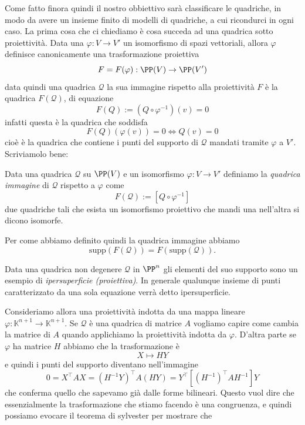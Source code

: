 \documentclass[11pt]{scrartcl}
\newcommand{\KK}{\mathbb{K}}
\begin{document}
	Come fatto finora quindi il nostro obbiettivo sarà classificare le quadriche, in modo da avere un insieme finito di modelli di quadriche, a cui ricondurci in ogni caso. La prima cosa che ci chiediamo è cosa succeda ad una quadrica sotto proiettività. Data una $\varphi:V\to V'$ un isomorfismo di spazi vettoriali, allora $\varphi$ definisce canonicamente una trasformazione proiettiva
	$$F=F(\varphi):\PP(V)\to\PP(V')$$
	data quindi una quadrica $\mathcal{Q}$ la sua immagine rispetto alla proiettività $F$ è la quadrica $F(\mathcal{Q})$, di equazione
	$$F(Q):=(Q\circ \varphi^{-1})(v)=0$$
	infatti questa è la quadrica che soddisfa
	$$F(Q)\left(\varphi(v)\right)=0 \iff Q(v)=0$$
	cioè è la quadrica che contiene i punti del supporto di $\mathcal{Q}$ mandati tramite $\varphi$ a $V'$. Scriviamolo bene: 
	\begin{definition}
		Data una quadrica $\mathcal{Q}$ su $\PP(V)$ e un isomorfismo $\varphi:V\to V'$ definiamo la \textit{quadrica immagine} di $\mathcal{Q}$ rispetto a $\varphi$ come
		$$F(\mathcal{Q}):=[Q\circ \varphi^{-1}]$$
		due quadriche tali che esista un isomorfismo proiettivo che mandi una nell'altra si dicono isomorfe.
	\end{definition}
	\begin{remark}
		Per come abbiamo definito quindi la quadrica immagine abbiamo
		$$\text{supp}\left(F\left(\mathcal{Q}\right)\right)=F\left(\text{supp}(\mathcal{Q})\right).$$
	\end{remark}
	\begin{definition}[Ipersuperficie]
		Data una quadrica non degenere $\mathcal{Q}$ in $\PP^n$ gli elementi del suo supporto sono un esempio di \textit{ipersuperficie (proiettiva)}. In generale qualunque insieme di punti caratterizzato da una sola equazione verrà detto ipersuperficie. 
	\end{definition}
	Consideriamo allora una proiettività indotta da una mappa lineare $\varphi:\KK^{n+1}\to \KK^{n+1}$. Se $\mathcal{Q}$ è una quadrica di matrice $A$ vogliamo capire come cambia la matrice di $A$ quando applichiamo la proiettività indotta da $\varphi$. D'altra parte se $\varphi$ ha matrice $H$ abbiamo che la trasformazione è
	$$X\mapsto HY$$
	e quindi i punti del supporto diventano nell'immagine
	$$0=X^\intercal A X = \left(H^{-1}Y\right)^\intercal A \left(HY\right)=Y^\intercal\left[\left(H^{-1}\right)^\intercal A H^{-1}\right]Y$$
	che conferma quello che sapevamo già dalle forme bilineari. Questo vuol dire che essenzialmente la trasformazione che stiamo facendo è una congruenza, e quindi possiamo evocare il teorema di sylvester per mostrare che
\end{document}
